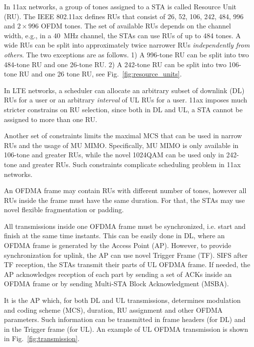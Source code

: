In 11ax networks, a group of tones assigned to a STA is called Resource Unit (RU).
The IEEE 802.11ax defines RUs that consist of 26, 52, 106, 242, 484, 996 and $2\times996$ OFDM tones.
The set of available RUs depends on the channel width, e.g., in a \SI{40}{\MHz} channel, the STAs can use RUs of up to 484 tones.
A wide RUs can be split into approximately twice narrower RUs \textit{independently from others}. The two exceptions are as follows.
1) A 996-tone RU can be split into two 484-tone RU and one 26-tone RU.
2) A 242-tone RU can be split into two 106-tone RU and one 26 tone RU, see Fig.~\ref{fig:resource_units}.

In LTE networks, a scheduler can allocate an arbitrary subset of downlink (DL) RUs for a user or an arbitrary \emph{interval} of UL RUs for a user.
11ax imposes much stricter constrains on RU selection, since both in DL and UL, a STA cannot be assigned to more than one RU.

Another set of constraints limits the maximal MCS that can be used in narrow RUs and the usage of MU MIMO.
Specifically, MU MIMO is only available in 106-tone and greater RUs, while the novel 1024QAM can be used only in 242-tone and greater RUs.
Such constraints complicate scheduling problem in 11ax networks.

An OFDMA frame may contain RUs with different number of tones, however all RUs inside the frame must have the same duration.
For that, the STAs may use novel flexible fragmentation or padding. 

All transmissions inside one OFDMA frame must be synchronized, i.e. start and finish at the same time instants.
This can be easily done in DL, where an OFDMA frame is generated by the Access Point (AP).
However, to provide synchronization for uplink, the AP can use novel Trigger Frame (TF).
SIFS after TF reception, the STAs transmit their parts of UL OFDMA frame.
If needed, the AP acknowledges reception of each part by sending a set of ACKs inside an OFDMA frame or by sending Multi-STA Block Acknowledgment (MSBA).

It is the AP which, for both DL and UL transmissions, determines modulation and coding scheme (MCS), duration, RU assignment and other OFDMA parameters. Such information can be transmitted in frame headers (for DL) and in the Trigger frame (for UL). An example of UL OFDMA transmission is shown in Fig.~\ref{fig:transmission}. 

